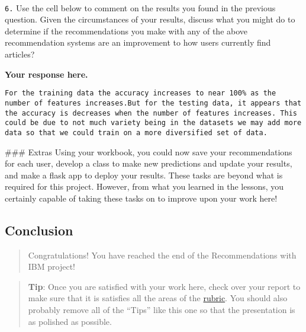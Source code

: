 \documentclass[11pt]{article}
\begin{document}
    \begin{center}
    \end{center}
    { \hspace*{\fill} \\}
    
    \texttt{6.} Use the cell below to comment on the results you found in
the previous question. Given the circumstances of your results, discuss
what you might do to determine if the recommendations you make with any
of the above recommendation systems are an improvement to how users
currently find articles?

    \textbf{Your response here.}

\begin{verbatim}
For the training data the accuracy increases to near 100% as the number of features increases.But for the testing data, it appears that the accuracy is decreases when the number of features increases. This could be due to not much variety being in the datasets we may add more data so that we could train on a more diversified set of data.
\end{verbatim}

     \#\#\# Extras Using your workbook, you could now save your
recommendations for each user, develop a class to make new predictions
and update your results, and make a flask app to deploy your results.
These tasks are beyond what is required for this project. However, from
what you learned in the lessons, you certainly capable of taking these
tasks on to improve upon your work here!

\hypertarget{conclusion}{%
\subsection{Conclusion}\label{conclusion}}

\begin{quote}
Congratulations! You have reached the end of the Recommendations with
IBM project!
\end{quote}

\begin{quote}
\textbf{Tip}: Once you are satisfied with your work here, check over
your report to make sure that it is satisfies all the areas of the
\href{https://review.udacity.com/\#!/rubrics/2322/view}{rubric}. You
should also probably remove all of the ``Tips'' like this one so that
the presentation is as polished as possible.
\end{quote}
\end{document}
